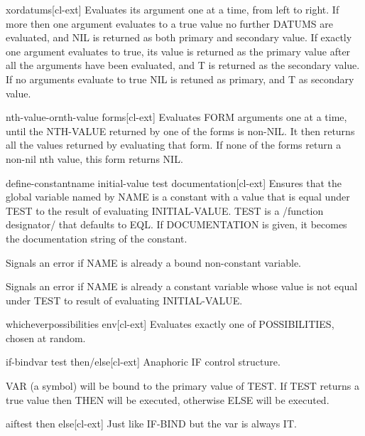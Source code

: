 \documentclass[10pt,english]{book}
\begin{document}
\begin{macro}{xor}{\rest datums}[cl-ext]
  Evaluates its argument one at a time, from left to right. If more then one
argument evaluates to a true value no further DATUMS are evaluated, and NIL is
returned as both primary and secondary value. If exactly one argument
evaluates to true, its value is returned as the primary value after all the
arguments have been evaluated, and T is returned as the secondary value. If no
arguments evaluate to true NIL is retuned as primary, and T as secondary
value.
\end{macro}

\begin{macro}{nth-value-or}{nth-value \body forms}[cl-ext]
  Evaluates FORM arguments one at a time, until the NTH-VALUE returned by one
of the forms is non-NIL. It then returns all the values returned by evaluating
that form. If none of the forms return a non-nil nth value, this form returns
NIL.
\end{macro}

\begin{macro}{define-constant}{name initial-value \key test documentation}[cl-ext]
  Ensures that the global variable named by NAME is a constant with a value
that is equal under TEST to the result of evaluating INITIAL-VALUE. TEST is a
/function designator/ that defaults to EQL. If DOCUMENTATION is given, it
becomes the documentation string of the constant.

Signals an error if NAME is already a bound non-constant variable.

Signals an error if NAME is already a constant variable whose value is not
equal under TEST to result of evaluating INITIAL-VALUE.
\end{macro}

\begin{macro}{whichever}{\rest possibilities \env env}[cl-ext]
  Evaluates exactly one of POSSIBILITIES, chosen at random.
\end{macro}

\begin{macro}{if-bind}{var test \body then/else}[cl-ext]
  Anaphoric IF control structure.

VAR (a symbol) will be bound to the primary value of TEST. If
TEST returns a true value then THEN will be executed, otherwise
ELSE will be executed.
\end{macro}

\begin{macro}{aif}{test then \op else}[cl-ext]
  Just like IF-BIND but the var is always IT.
\end{macro}
\end{document}
